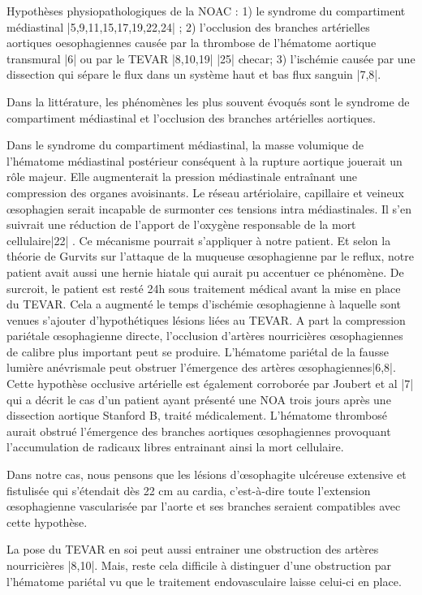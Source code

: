 \documentclass[./tfe.tex]{subfiles}
\begin{document}
Hypothèses physiopathologiques de la NOAC :
1) le syndrome du compartiment médiastinal |5,9,11,15,17,19,22,24| ;
2) l’occlusion des branches artérielles aortiques oesophagiennes causée par la thrombose de l'hématome aortique transmural |6| ou par le TEVAR |8,10,19| |25| checar;
3) l’ischémie causée par une dissection qui sépare le flux dans un système haut et bas flux sanguin |7,8|.

Dans la littérature, les phénomènes les plus souvent évoqués sont le syndrome de compartiment médiastinal et l’occlusion des branches artérielles aortiques.

Dans le syndrome du compartiment médiastinal, la masse volumique de l'hématome médiastinal postérieur conséquent à la rupture aortique jouerait un rôle majeur. Elle augmenterait la pression médiastinale entraînant une compression des organes avoisinants. Le réseau artériolaire, capillaire et veineux œsophagien serait incapable de surmonter ces tensions intra médiastinales. Il s’en suivrait une réduction de l’apport de l’oxygène responsable de la mort cellulaire|22| . Ce mécanisme pourrait s’appliquer à notre patient. Et selon la théorie de Gurvits sur l’attaque de la muqueuse œsophagienne par le reflux, notre patient avait aussi une hernie hiatale qui aurait pu accentuer ce phénomène.
De surcroit, le patient est resté 24h sous traitement médical avant la mise en place du TEVAR. Cela a augmenté le temps d’ischémie œsophagienne à laquelle sont venues s’ajouter d’hypothétiques lésions liées au TEVAR.
A part la compression pariétale œsophagienne directe, l’occlusion d’artères nourricières œsophagiennes de calibre plus important peut se produire. L’hématome pariétal de la fausse lumière anévrismale peut obstruer l’émergence des artères œsophagiennes|6,8|. Cette hypothèse occlusive artérielle est également corroborée par Joubert et al |7| qui a décrit le cas d'un patient ayant présenté une NOA trois jours après une dissection aortique Stanford B, traité médicalement. L'hématome thrombosé aurait obstrué l’émergence des branches aortiques œsophagiennes provoquant l'accumulation de radicaux libres entrainant ainsi la mort cellulaire.

Dans notre cas, nous pensons que les lésions d’œsophagite ulcéreuse extensive et fistulisée qui s'étendait dès 22 cm au cardia, c'est-à-dire toute l'extension œsophagienne vascularisée par l'aorte et ses branches seraient compatibles avec cette hypothèse.

La pose du TEVAR en soi peut aussi entrainer une obstruction des artères nourricières |8,10|. Mais, reste cela difficile à distinguer d’une obstruction par l’hématome pariétal vu que le traitement endovasculaire laisse celui-ci en place.
\end{document}
